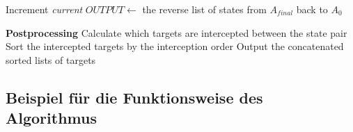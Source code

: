 \documentclass[german,version-2019-11]{uzl-thesis}
\begin{document}
{\begin{minipage}{1\linewidth}
\begin{algorithm}[H]
\begin{algorithmic}
\EndIf
\State Increment \emph{current}
\EndWhile
\State $OUTPUT \leftarrow$ the reverse list of states from $A_{final}$ back to $A_0$

\State \textbf{Postprocessing}
\State Calculate which targets are intercepted between the state pair 
\State Sort the intercepted targets by the interception order
\EndFor
\State Output the concatenated sorted lists of targets
\end{algorithmic}
\end{algorithm}
\end{minipage}
}

\subsection{Beispiel für die Funktionsweise des Algorithmus}
\end{document}
